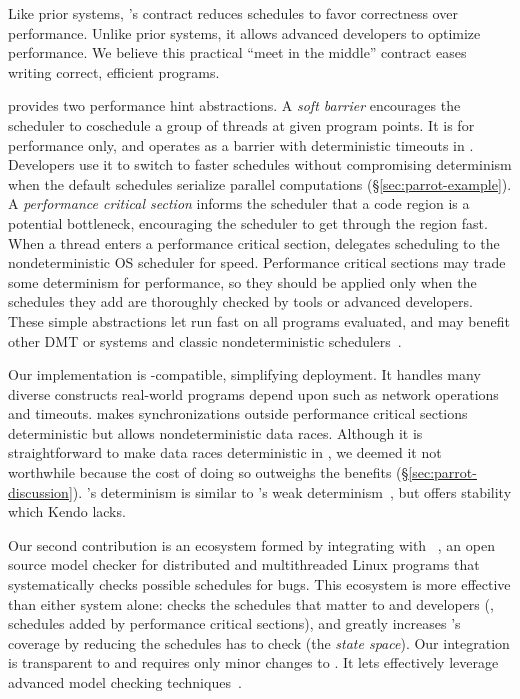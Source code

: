 Like prior systems, \parrot's contract reduces schedules to favor correctness
over performance.  Unlike prior systems, it allows advanced developers
to optimize performance.  We believe this practical ``meet in the
middle'' contract eases writing correct, efficient programs.


\parrot provides two performance hint abstractions.  A \emph{soft
  barrier} encourages the scheduler to coschedule a group of threads at
given program points.  It is for performance only, and operates as a
barrier with deterministic timeouts in \parrot.  Developers use it to switch
to faster schedules without compromising determinism
when the default schedules serialize parallel
computations (\S\ref{sec:parrot-example}).  A \emph{performance critical
section}
informs the scheduler that a code region is a potential
bottleneck, encouraging the scheduler to get through the region fast.
When a thread enters a performance critical section, \parrot delegates
scheduling to the
nondeterministic OS scheduler for speed.  
Performance critical sections may trade some determinism for
performance, so they should be applied only when the schedules they add
are thoroughly checked by tools or advanced developers.
These simple abstractions
let \parrot run fast on all programs evaluated, and
may benefit other DMT or \smt systems and classic nondeterministic
schedulers~\cite{coschedule:sigmetrics96, coschedule, partial-barrier:atc06}.


Our \parrot implementation is \pthread-compatible, simplifying deployment.
It handles many diverse constructs real-world programs depend upon such as
network operations and timeouts.  \parrot makes synchronizations outside
performance critical sections deterministic but allows nondeterministic
data races.  Although it is
straightforward to make data races deterministic in \parrot,
we deemed it not worthwhile because the cost of doing so outweighs the
benefits (\S\ref{sec:parrot-discussion}).  \parrot's determinism is similar to
\kendo's weak determinism~\cite{kendo:asplos09}, but \parrot offers stability
which Kendo lacks.


Our second contribution is an ecosystem formed by integrating \parrot with
\dbug~\cite{dbug:spin11}, an open source model checker for 
distributed and multithreaded Linux programs that systematically checks possible
schedules for bugs.
This \ecosys ecosystem is more effective than
either system alone: \dbug checks the schedules
that matter to \parrot and developers (\eg, schedules added by performance
critical sections), and \parrot greatly increases \dbug's coverage by
reducing the schedules \dbug has to check (the \emph{state space}). Our
integration is transparent to \dbug and requires only minor
changes to \parrot.  It lets \parrot effectively leverage advanced model
checking techniques~\cite{flanagan:dynamicpo, demeter:sosp11}.


